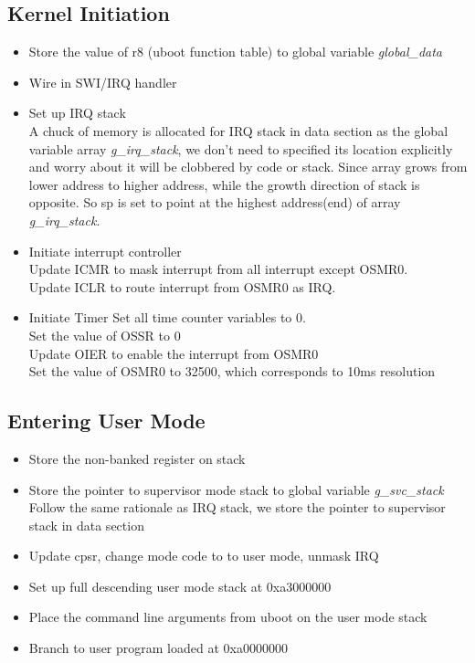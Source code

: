 \documentclass{article}
\begin{document}
\subsection{Kernel Initiation}
\begin{itemize}
	\setlength{\itemsep}{1pt}
	\setlength{\parskip}{0pt}
	\setlength{\parsep}{0pt}
	\item Store the value of r8 (uboot function table) to global variable {\it global\_data}
	\item Wire in SWI/IRQ handler
	\item Set up IRQ stack\\
		A chuck of memory is allocated for IRQ stack in data section as the global variable array {\it g\_irq\_stack}, we don't need to specified its location explicitly and worry about it will be clobbered by code or stack. Since array grows from lower address to higher address, while the growth direction of stack is opposite. So sp is set to point at the highest address(end) of array {\it g\_irq\_stack}. \\
	\item Initiate interrupt controller\\
		Update ICMR to mask interrupt from all interrupt except OSMR0.\\
		Update ICLR to route interrupt from OSMR0 as IRQ.\\
	\item Initiate Timer
		Set all time counter variables to 0.\\
		Set the value of OSSR to 0\\
		Update OIER to enable the interrupt from OSMR0\\
		Set the value of OSMR0 to 32500, which corresponds to 10ms resolution\\
\end{itemize}

\subsection{Entering User Mode}
\begin{itemize}
	\setlength{\itemsep}{1pt}
	\setlength{\parskip}{0pt}
	\setlength{\parsep}{0pt}
	\item Store the non-banked register on stack
	\item Store the pointer to supervisor mode stack to global variable {\it g\_svc\_stack}\\
		Follow the same rationale as IRQ stack, we store the pointer to supervisor stack in data section\\
	\item Update cpsr, change mode code to to user mode, unmask IRQ
	\item Set up full descending user mode stack at 0xa3000000
	\item Place the command line arguments from uboot on the user mode stack
	\item Branch to user program loaded at 0xa0000000
\end{itemize}
\end{document}
